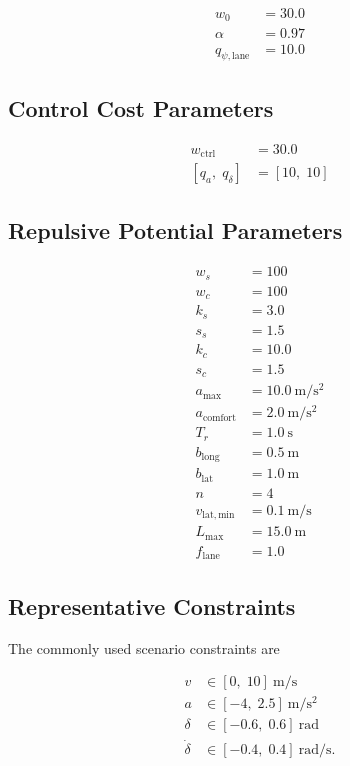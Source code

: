 \documentclass[11pt]{article}
\begin{document}
\begin{align}
w_0 &= 30.0 \\
\alpha &= 0.97 \\
q_{\psi,\mathrm{lane}} &= 10.0
\end{align}

\subsection{Control Cost Parameters}

\begin{align}
w_{\mathrm{ctrl}} &= 30.0 \\
[q_a,\; q_{\delta}] &= [10,\; 10]
\end{align}

\subsection{Repulsive Potential Parameters}

\begin{align}
w_s &= 100 \\
w_c &= 100 \\
k_s &= 3.0 \\
s_s &= 1.5 \\
k_c &= 10.0 \\
s_c &= 1.5 \\
a_{\max} &= 10.0~\mathrm{m/s^2} \\
a_{\mathrm{comfort}} &= 2.0~\mathrm{m/s^2} \\
T_r &= 1.0~\mathrm{s} \\
b_{\mathrm{long}} &= 0.5~\mathrm{m} \\
b_{\mathrm{lat}} &= 1.0~\mathrm{m} \\
n &= 4 \\
v_{\mathrm{lat,min}} &= 0.1~\mathrm{m/s} \\
L_{\max} &= 15.0~\mathrm{m} \\
f_{\mathrm{lane}} &= 1.0
\end{align}

\subsection{Representative Constraints}

The commonly used scenario constraints are

\begin{align}
v &\in [0,\; 10]~\mathrm{m/s} \\
a &\in [-4,\; 2.5]~\mathrm{m/s^2} \\
\delta &\in [-0.6,\; 0.6]~\mathrm{rad} \\
\dot{\delta} &\in [-0.4,\; 0.4]~\mathrm{rad/s}.
\end{align}
\end{document}
